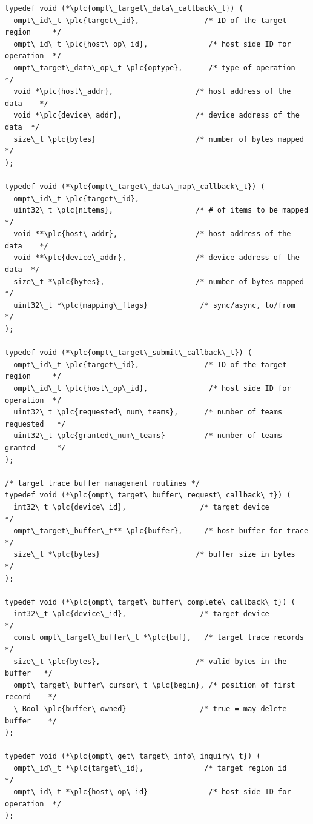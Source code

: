 \documentclass{article}
\begin{document}
\begin{boxedcode}
\begin{verbatim}
typedef void (*\plc{ompt\_target\_data\_callback\_t}) (
  ompt\_id\_t \plc{target\_id},               /* ID of the target region     */
  ompt\_id\_t \plc{host\_op\_id},              /* host side ID for operation  */
  ompt\_target\_data\_op\_t \plc{optype},      /* type of operation           */
  void *\plc{host\_addr},                   /* host address of the data    */
  void *\plc{device\_addr},                 /* device address of the data  */ 
  size\_t \plc{bytes}                       /* number of bytes mapped      */
);

typedef void (*\plc{ompt\_target\_data\_map\_callback\_t}) (
  ompt\_id\_t \plc{target\_id}, 
  uint32\_t \plc{nitems},                   /* # of items to be mapped     */
  void **\plc{host\_addr},                  /* host address of the data    */
  void **\plc{device\_addr},                /* device address of the data  */ 
  size\_t *\plc{bytes},                     /* number of bytes mapped      */
  uint32\_t *\plc{mapping\_flags}            /* sync/async, to/from         */
);

typedef void (*\plc{ompt\_target\_submit\_callback\_t}) (
  ompt\_id\_t \plc{target\_id},               /* ID of the target region     */
  ompt\_id\_t \plc{host\_op\_id},              /* host side ID for operation  */
  uint32\_t \plc{requested\_num\_teams},      /* number of teams requested   */
  uint32\_t \plc{granted\_num\_teams}         /* number of teams granted     */
);

/* target trace buffer management routines */
typedef void (*\plc{ompt\_target\_buffer\_request\_callback\_t}) (
  int32\_t \plc{device\_id},                 /* target device               */
  ompt\_target\_buffer\_t** \plc{buffer},     /* host buffer for trace       */
  size\_t *\plc{bytes}                      /* buffer size in bytes        */
);
  
typedef void (*\plc{ompt\_target\_buffer\_complete\_callback\_t}) (
  int32\_t \plc{device\_id},                 /* target device               */
  const ompt\_target\_buffer\_t *\plc{buf},   /* target trace records        */
  size\_t \plc{bytes},                      /* valid bytes in the buffer   */
  ompt\_target\_buffer\_cursor\_t \plc{begin}, /* position of first record    */
  \_Bool \plc{buffer\_owned}                 /* true = may delete buffer    */
);

typedef void (*\plc{ompt\_get\_target\_info\_inquiry\_t}) (
  ompt\_id\_t *\plc{target\_id},              /* target region id            */
  ompt\_id\_t *\plc{host\_op\_id}              /* host side ID for operation  */
);


\end{verbatim}
\end{boxedcode}
\end{document}
